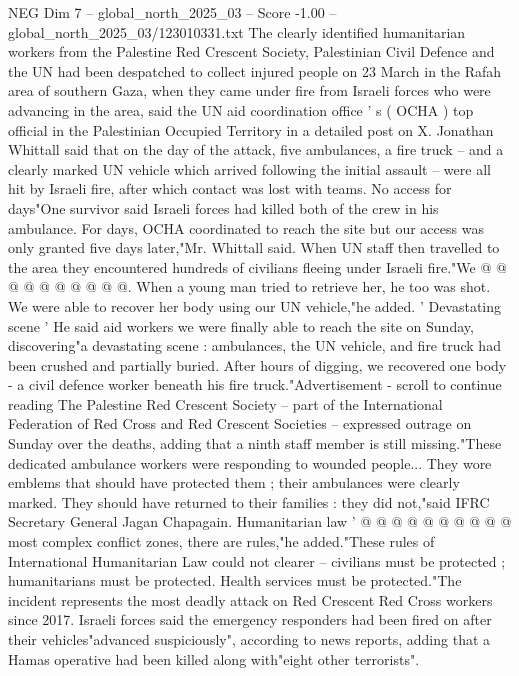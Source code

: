 \begin{textsample}{NEG Dim 7 – global\_north\_2025\_03 – Score -1.00 – global\_north\_2025\_03/123010331.txt}  \label{ex:f7_neg_132}
The clearly identified humanitarian workers from the Palestine Red Crescent Society, Palestinian Civil Defence and the UN had been despatched to collect injured people on 23 March in the Rafah area of southern Gaza, when they came under fire from Israeli forces who were advancing in the area, said the UN aid coordination office ' s ( OCHA ) top official in the Palestinian Occupied Territory in a detailed post on X.
Jonathan Whittall said that on the day of the attack, five ambulances, a fire truck -- and a clearly marked UN vehicle which arrived following the initial assault -- were all hit by Israeli fire, after which contact was lost with teams.
No access for days"One survivor said Israeli forces had killed both of the crew in his ambulance.
For days, OCHA coordinated to reach the site but our access was only granted five days later,"Mr.
Whittall said.
When UN staff then travelled to the area they encountered hundreds of civilians fleeing under Israeli fire."We @ @ @ @ @ @ @ @ @ @.
When a young man tried to retrieve her, he too was shot.
We were able to recover her body using our UN vehicle,"he added. ' Devastating scene ' He said aid workers we were finally able to reach the site on Sunday, discovering"a devastating scene : ambulances, the UN vehicle, and fire truck had been crushed and partially buried.
After hours of digging, we recovered one body - a civil defence worker beneath his fire truck."Advertisement - scroll to continue reading The Palestine Red Crescent Society -- part of the International Federation of Red Cross and Red Crescent Societies -- expressed outrage on Sunday over the deaths, adding that a ninth staff member is still missing."These dedicated ambulance workers were responding to wounded people...
They wore emblems that should have protected them ; their ambulances were clearly marked.
They should have returned to their families : they did not,"said IFRC Secretary General Jagan Chapagain.
Humanitarian law ' @ @ @ @ @ @ @ @ @ @ most complex conflict zones, there are rules,"he added."These rules of International Humanitarian Law could not clearer -- civilians must be protected ; humanitarians must be protected.
Health services must be protected."The incident represents the most deadly attack on Red Crescent Red Cross workers since 2017.
Israeli forces said the emergency responders had been fired on after their vehicles"advanced suspiciously", according to news reports, adding that a Hamas operative had been killed along with"eight other terrorists".

\end{textsample}
